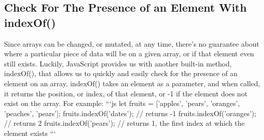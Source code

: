 \documentclass{article}%
\begin{document}
%
\subsection{Check For The Presence of an Element With indexOf()}%
\label{subsec:CheckForThePresenceofanElementWithindexOf()}%
Since arrays can be changed, or mutated, at any time, there's no guarantee about where a particular piece of data will be on a given array, or if that element even still exists. Luckily, JavaScript provides us with another built{-}in method, indexOf(), that allows us to quickly and easily check for the presence of an element on an array. indexOf() takes an element as a parameter, and when called, it returns the position, or index, of that element, or {-}1 if the element does not exist on the array.\newline%
For example:\newline%
```js\newline%
let fruits = {[}'apples', 'pears', 'oranges', 'peaches', 'pears'{]};\newline%
fruits.indexOf('dates'); // returns {-}1\newline%
fruits.indexOf('oranges'); // returns 2\newline%
fruits.indexOf('pears'); // returns 1, the first index at which the element exists\newline%
```\newline%

%
\end{document}
